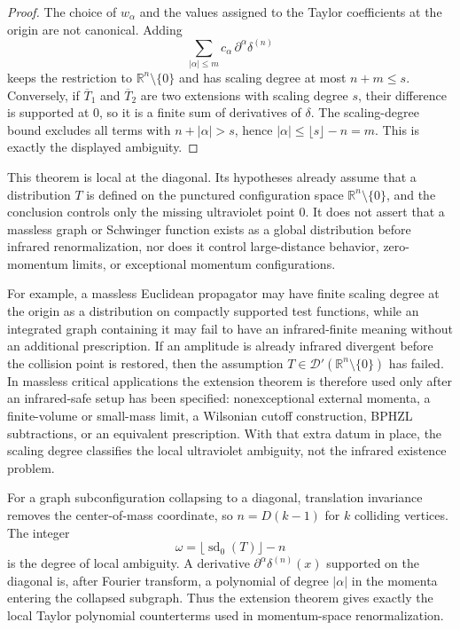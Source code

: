 \begin{proof}
The choice of \(w_\alpha\) and the values assigned to the Taylor coefficients
at the origin are not canonical.  Adding
\[
  \sum_{|\alpha|\le m} c_\alpha\,\partial^\alpha\delta^{(n)}
\]
keeps the restriction to \(\mathbb R^n\setminus\{0\}\) and has scaling degree
at most \(n+m\le s\).  Conversely, if \(\overline T_1\) and
\(\overline T_2\) are two extensions with scaling degree \(s\), their
difference is supported at \(0\), so it is a finite sum of derivatives of
\(\delta\).  The scaling-degree bound excludes all terms with
\(n+|\alpha|>s\), hence \(|\alpha|\le\lfloor s\rfloor-n=m\).  This is exactly
the displayed ambiguity.
\end{proof}

\begin{remark}
\label{rem:uv-content-scaling-degree-theorem}
This theorem is local at the diagonal.  Its hypotheses already assume that a
distribution \(T\) is defined on the punctured configuration space
\(\mathbb R^n\setminus\{0\}\), and the conclusion controls only the missing
ultraviolet point \(0\).  It does not assert that a massless graph or
Schwinger function exists as a global distribution before infrared
renormalization, nor does it control large-distance behavior, zero-momentum
limits, or exceptional momentum configurations.

For example, a massless Euclidean propagator may have finite scaling degree at
the origin as a distribution on compactly supported test functions, while an
integrated graph containing it may fail to have an infrared-finite meaning
without an additional prescription.  If an amplitude is already infrared
divergent before the collision point is restored, then the assumption
\(T\in\mathcal D'(\mathbb R^n\setminus\{0\})\) has failed.  In massless
critical applications the extension theorem is therefore used only after an
infrared-safe setup has been specified: nonexceptional external momenta, a
finite-volume or small-mass limit, a Wilsonian cutoff construction, BPHZL
subtractions, or an equivalent prescription.  With that extra datum in place,
the scaling degree classifies the local ultraviolet ambiguity, not the
infrared existence problem.
\end{remark}

For a graph subconfiguration collapsing to a diagonal, translation invariance
removes the center-of-mass coordinate, so \(n=D(k-1)\) for \(k\) colliding
vertices.  The integer
\[
  \omega=\lfloor \operatorname{sd}_0(T)\rfloor-n
\]
is the degree of local ambiguity.  A derivative
\(\partial^\alpha\delta^{(n)}(x)\) supported on the diagonal is, after
Fourier transform, a polynomial of degree \(|\alpha|\) in the momenta entering
the collapsed subgraph.  Thus the extension theorem gives exactly the local
Taylor polynomial counterterms used in momentum-space renormalization.

